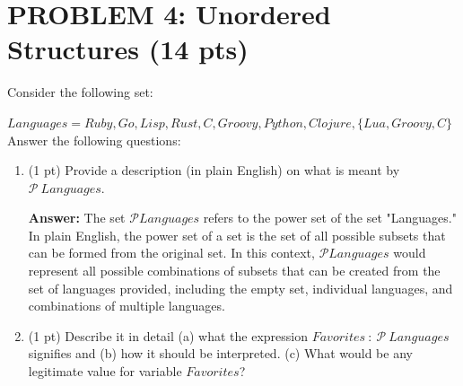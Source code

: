 \documentclass[12pt]{article}
\begin{document}
\begin{spacing}{1.5}
\begin{enumerate}
\begin{center}
		      \end{center}
		      		      		      
		      		      		        
	\end{enumerate}	    
	\newpage
	\section*{PROBLEM 4: Unordered Structures (14 pts)}
			
	Consider the following set:
		
	$Languages=Ruby, Go, Lisp, Rust, C, Groovy, Python, Clojure, \{Lua, Groovy, C\}$\\
		
	Answer the following questions:
		
	\begin{enumerate}
		\item (1 pt) Provide a description (in plain English) on what is meant by $\mathcal{P} \: Languages$.
		      		      
		      \textbf{Answer:} The set $\mathcal{P} Languages$ refers to the power set of the set "Languages." In plain English, the power set of a set is the set of all possible subsets that can be formed from the original set. In this context, $\mathcal{P} Languages$ would represent all possible combinations of subsets that can be created from the set of languages provided, including the empty set, individual languages, and combinations of multiple languages.\\
		      		      
		\item (1 pt) Describe it in detail (a) what the expression $Favorites\: : \: \mathcal{P} \: Languages$ signifies and (b) how it should be interpreted. (c) What would be any legitimate value for variable $Favorites$?
		      		      

\end{enumerate}
\end{spacing}
\end{document}
